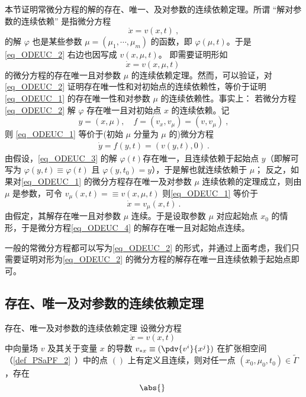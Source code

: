 
本节证明常微分方程的解的存在、唯一、及对参数的连续依赖定理。所谓 “解对参数的连续依赖” 是指微分方程
\begin{equation}\label{eq_ODEUC_2}
\dot x=v(x,t)~,
\end{equation}
 的解 $\varphi$ 也是某些参数 $\mu=(\mu_1,\cdots,\mu_m)$ 的函数，即 $\varphi(\mu,t)$。于是 \autoref{eq_ODEUC_2} 右边也因写成 $v(x,\mu,t)$。 即需要证明形如
\begin{equation}\label{eq_ODEUC_1}
\dot x=v(x,\mu,t)~
\end{equation}
的微分方程的存在唯一且对参数 $\mu$ 的连续依赖定理。然而，可以验证，对\autoref{eq_ODEUC_2} 证明存在唯一性和对初始点的连续依赖性，等价于证明\autoref{eq_ODEUC_1} 的存在唯一性和对参数 $\mu$ 的连续依赖性。事实上：
若微分方程\autoref{eq_ODEUC_2} 解 $\varphi$ 存在唯一且对初始点 $x$ 的连续依赖。记 
\begin{equation}
y=(x,\mu),\quad f=(v_x,v_{\mu})=(v,v_{\mu})~,
\end{equation}
则 \autoref{eq_ODEUC_1} 等价于(初始 $\mu$ 分量为 $\mu$ 的)微分方程
\begin{equation}\label{eq_ODEUC_3}
\begin{aligned}
\dot y=f(y,t)=(v(y,t),0)~.
\end{aligned}
\end{equation}
由假设，\autoref{eq_ODEUC_3} 的解 $\varphi(t)$存在唯一，且连续依赖于起始点 $y$（即解可写为 $\varphi(y,t)\equiv\varphi(t)$ 且 $\varphi(y,t_0)=y$），于是解也就连续依赖于 $\mu$；
反之，如果对\autoref{eq_ODEUC_1} 的微分方程存在唯一及对参数 $\mu$ 连续依赖的定理成立，则由 $\mu$ 是参数，可令 $v_\mu(x,t)=\equiv v(x,\mu,t)$ 则\autoref{eq_ODEUC_1} 等价于
\begin{equation}\label{eq_ODEUC_4} 
\dot x=v_{\mu}(x,t)~.
\end{equation}
由假定，其解存在唯一且对参数 $\mu$ 连续。于是设取参数 $\mu$ 对应起始点 $x_0$ 的情形，于是微分方程\autoref{eq_ODEUC_4} 的解存在唯一且对起始点连续。

一般的常微分方程都可以写为\autoref{eq_ODEUC_2} 的形式，并通过上面考虑，我们只需要证明对形为\autoref{eq_ODEUC_2} 的微分方程的解存在唯一且连续依赖于起始点即可。

\subsection{存在、唯一及对参数的连续依赖定理}
\begin{theorem}{存在、唯一及对参数的连续依赖定理}
设微分方程
\begin{equation}
\dot x=v(x,t)~
\end{equation}
中向量场 $v$ 及其关于变量 $x$ 的导数 $v_{*x}\equiv(\pdv{v^i}{x^j})$ 在扩张相空间（\autoref{def_PSaPF_2}~）中的点 $()$ 上有定义且连续，则对任一点 $(x_0,\mu_0,t_0)\in\tilde\Gamma$，存在
\begin{equation}
\abs{}~
\end{equation}

\end{theorem}
